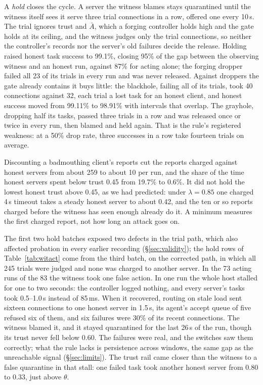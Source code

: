 \documentclass[10pt,twocolumn,letterpaper]{article}
\newcommand{\Agate}{\bar{A}}
\begin{document}
A \emph{hold} closes the cycle. A server the witness blames stays quarantined
until the witness itself sees it serve three trial connections in a row,
offered one every 10\,s. The trial ignores trust and $\Agate$, which a forging
controller holds high and the gate holds at its ceiling, and the witness judges
only the trial connections, so neither the controller's records nor the
server's old failures decide the release. Holding raised honest task success
to 99.1\%, closing 95\% of the gap between the observing witness and an honest
run, against 87\% for acting alone; the forging dropper failed all 23 of its
trials in every run and was never released. Against droppers the gate already
contains it buys little: the blackhole, failing all of its trials, took 40
connections against 32, each trial a lost task for an honest client, and
honest success moved from 99.11\% to 98.91\% with intervals that overlap. The
grayhole, dropping half its tasks, passed three trials in a row and was
released once or twice in every run, then blamed and held again. That is the
rule's registered weakness: at a 50\% drop rate, three successes in a row take
fourteen trials on average.

Discounting a badmouthing client's reports cut the reports charged against
honest servers from about 259 to about 10 per run, and the share of the time
honest servers spent below trust 0.45 from 19.7\% to 0.6\%. It did not hold
the lowest honest trust above 0.45, as we had predicted: under $\lambda = 0.85$
one charged 4\,s timeout takes a steady honest server to about 0.42, and the
ten or so reports charged before the witness has seen enough already do it. A
minimum measures the first charged report, not how long an attack goes on.

The first two hold batches exposed two defects in the trial path, which also
affected probation in every earlier recording (\S\ref{sec:validity}); the hold
rows of Table~\ref{tab:witact} come from the third batch, on the corrected
path, in which all 245 trials were judged and none was charged to another
server. In the 73 acting runs of the 83 the witness took one false action. In
one run the whole host stalled for one to two seconds: the controller logged
nothing, and every server's tasks took 0.5--1.0\,s instead of 85\,ms. When it
recovered, routing on stale load sent sixteen connections to one honest
server in 1.5\,s, its agent's accept queue of five refused six of them, and
six failures were 30\% of its recent connections. The witness blamed it, and
it stayed quarantined for the last 26\,s of the run, though its trust never
fell below 0.60. The failures were real, and the switches saw them correctly;
what the rule lacks is persistence across windows, the same gap as the
unreachable signal (\S\ref{sec:limits}). The trust rail came closer than the
witness to a false quarantine in that stall: one failed task took another
honest server from 0.80 to 0.33, just above $\theta$.
\end{document}
